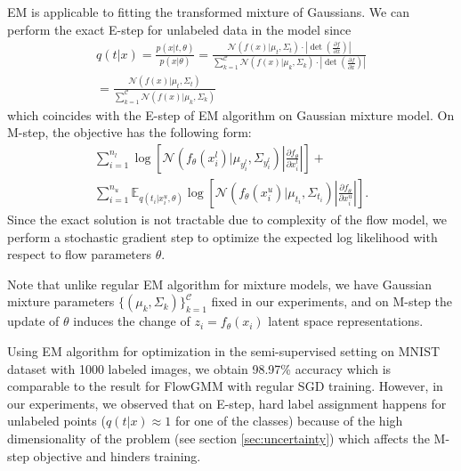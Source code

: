 \documentclass{article}
\newcommand{\method}{FlowGMM\xspace}
\newcommand{\mC}{\mathcal{C}}
\newcommand{\mN}{\mathcal{N}}
\begin{document}
EM is applicable to fitting the transformed mixture of Gaussians.
We can perform the exact E-step for unlabeled data in the model since
\begin{align*}
    q(t | x) = \frac{p(x | t, \theta)}{p(x | \theta)} = \frac{\mN(f(x) \vert \mu_t, \Sigma_t) \cdot \left| \det \left( \frac {\partial f}{\partial x} \right) \right| }{\sum_{k=1}^{\mC} \mN(f(x) \vert \mu_k, \Sigma_k) \cdot \left| \det \left( \frac {\partial f}{\partial x} \right) \right| }\\ =  \frac{\mN(f(x) \vert \mu_t, \Sigma_t) }{\sum_{k=1}^{\mC} \mN(f(x) \vert \mu_k, \Sigma_k) }
\end{align*}
which coincides with the E-step of EM algorithm on Gaussian mixture model.
On M-step, the objective has the following form:
\begin{align*}
    \sum_{i=1}^{n_l} \log\left[ \mN( f_{\theta}(x^l_i) | \mu_{y^l_i}, \Sigma_{y^l_i}) \left|\frac {\partial f_{\theta}}{\partial x^l_i}\right| \right] + \\ \sum_{i=1}^{n_u} \mathbb{E}_{q(t_i | x^u_i, \theta)} \log\left[ \mN( f_{\theta}(x^u_i) | \mu_{t_i}, \Sigma_{t_i}) \left|\frac {\partial f_{\theta}}{\partial x^u_i}\right| \right].
\end{align*}
Since the exact solution is not tractable due to complexity of the flow model, we perform a stochastic gradient step to optimize the expected log likelihood with respect to flow parameters $\theta$.

Note that unlike regular EM algorithm for mixture models, we have Gaussian mixture parameters $\{(\mu_k, \Sigma_k)\}_{k=1}^{\mC}$ fixed in our experiments, and on M-step the update of $\theta$ induces the change of $z_i = f_{\theta}(x_i)$ latent space representations.

Using EM algorithm for optimization in the semi-supervised setting on MNIST dataset with 1000 labeled images, we obtain 98.97\% accuracy which is comparable to the result for \method with regular SGD training. However, in our experiments, we observed that on E-step, hard label assignment happens for unlabeled points ($q(t|x) \approx 1$ for one of the classes) because of the high dimensionality of the problem (see section \ref{sec:uncertainty}) which affects the M-step objective and hinders training.
\end{document}
